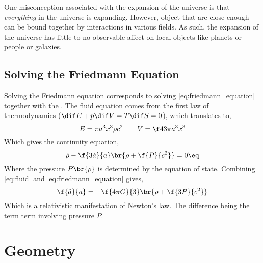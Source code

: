 \documentclass{article}
\begin{document}
One misconception associated with the expansion of the universe is that \textit{everything} in the universe is expanding. However, object that are close enough can be bound together by interactions in various fields. As such, the expansion of the universe has little to no observable affect on local objects like planets or people or galaxies. \\

\subsection{Solving the Friedmann Equation}

Solving the Friedmann equation corresponds to solving \cref{eq:friedmann_equation} together with the . The fluid equation comes from the first law of thermodynamics ($\dif E + p \dif V = T \dif S = 0$), which translates to,
\[ E = \pi a^3 x^3 \rho c^2 \qquad V = \f43 \pi a^3 x^3 \]
Which gives the continuity equation,
\[ \dot{\rho} - \f{3\dot{a}}{a} \br{\rho + \f{P}{c^2}} = 0 \eq \label{eq:fluid}\]
Where the pressure $P\br{\rho}$ is determined by the equation of state. Combining \cref{eq:fluid} and \cref{eq:friedmann_equation} gives,
\[ \f{\ddot{a}}{a} = - \f{4 \pi G}{3} \br{\rho + \f{3P}{c^2}} \]
Which is a relativistic manifestation of Newton's law. The difference being the term term involving pressure $P$.

\section{Geometry}
\end{document}
